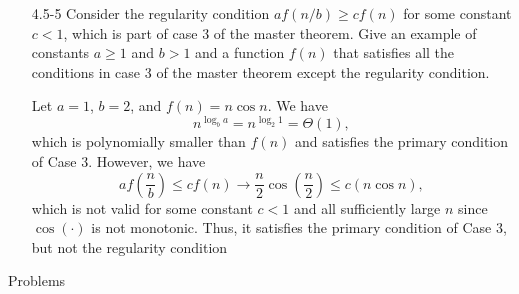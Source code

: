 \begin{enumerate}
\begin{framed}
\end{framed}

\item[4.5{-}5]{Consider the regularity condition $a f(n/b) \ge c f(n)$ for some
constant $c < 1$, which is part of case 3 of the master theorem. Give an example
of constants $a \ge 1$ and $b > 1$ and a function $f(n)$ that satisfies all
the conditions in case 3 of the master theorem except the regularity
condition.}

\begin{framed}
Let $a = 1$, $b = 2$, and $f(n) = n \cos n$. We have
\[
  n^{\log_b a} = n^{\log_2 1} = \Theta(1),
\]
which is polynomially smaller than $f(n)$ and satisfies the primary condition of
Case 3. However, we have
\[
  a f\left(\frac{n}{b}\right) \le c f(n) \rightarrow \frac{n}{2} \cos\left(\frac{n}{2}\right) \le c ( n \cos n ),
\]
which is not valid for some constant $c < 1$ and all sufficiently large $n$
since $\cos(\cdot)$ is not monotonic. Thus, it satisfies the primary condition
of Case 3, but not the regularity condition
\end{framed}

\end{enumerate}

\newpage

{\large Problems}

